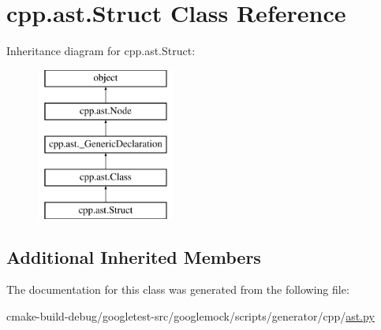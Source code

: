 \hypertarget{classcpp_1_1ast_1_1Struct}{}\section{cpp.\+ast.\+Struct Class Reference}
\label{classcpp_1_1ast_1_1Struct}
Inheritance diagram for cpp.\+ast.\+Struct\+:\begin{figure}[H]
\begin{center}
\leavevmode
\includegraphics[height=5.000000cm]{classcpp_1_1ast_1_1Struct}
\end{center}
\end{figure}
\subsection*{Additional Inherited Members}


The documentation for this class was generated from the following file\+:\begin{DoxyCompactItemize}
\item 
cmake-\/build-\/debug/googletest-\/src/googlemock/scripts/generator/cpp/\mbox{\hyperlink{ast_8py}{ast.\+py}}\end{DoxyCompactItemize}

